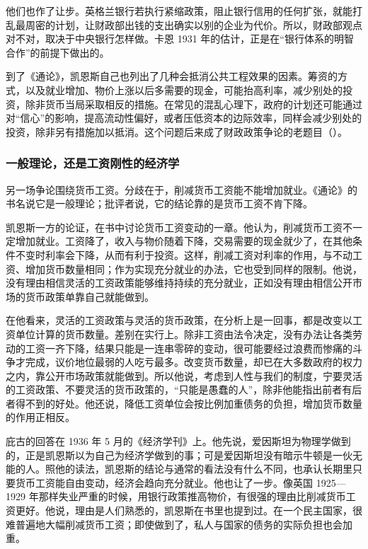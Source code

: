 他们也作了让步。英格兰银行若执行紧缩政策，阻止银行信用的任何扩张，就能打乱最周密的计划，让财政部出钱的支出确实以别的企业为代价\cite{keynes1929c}。所以，财政部观点对不对，取决于中央银行怎样做。卡恩 1931 年的估计，正是在“银行体系的明智合作”的前提下做出的\cite{kahn1931}。

到了《通论》，凯恩斯自己也列出了几种会抵消公共工程效果的因素\cite{keynes1936}。筹资的方式，以及就业增加、物价上涨以后多需要的现金，可能抬高利率，减少别处的投资，除非货币当局采取相反的措施\cite{keynes1936}。在常见的混乱心理下，政府的计划还可能通过对“信心”的影响，提高流动性偏好，或者压低资本的边际效率，同样会减少别处的投资，除非另有措施加以抵消\cite{keynes1936}。这个问题后来成了财政政策争论的老题目（）。

\subsubsection{一般理论，还是工资刚性的经济学}
另一场争论围绕货币工资。分歧在于，削减货币工资能不能增加就业。《通论》的书名说它是一般理论；批评者说，它的结论靠的是货币工资不肯下降。

凯恩斯一方的论证，在书中讨论货币工资变动的一章。他认为，削减货币工资不一定增加就业。工资降了，收入与物价随着下降，交易需要的现金就少了，在其他条件不变时利率会下降，从而有利于投资\cite{keynes1936}。这样，削减工资对利率的作用，与不动工资、增加货币数量相同；作为实现充分就业的办法，它也受到同样的限制\cite{keynes1936}。他说，没有理由相信灵活的工资政策能够维持持续的充分就业，正如没有理由相信公开市场的货币政策单靠自己就能做到\cite{keynes1936}。

在他看来，灵活的工资政策与灵活的货币政策，在分析上是一回事，都是改变以工资单位计算的货币数量\cite{keynes1936}。差别在实行上。除非工资由法令决定，没有办法让各类劳动的工资一齐下降，结果只能是一连串零碎的变动，很可能要经过浪费而惨痛的斗争才完成，议价地位最弱的人吃亏最多\cite{keynes1936}。改变货币数量，却已在大多数政府的权力之内，靠公开市场政策就能做到\cite{keynes1936}。所以他说，考虑到人性与我们的制度，宁要灵活的工资政策、不要灵活的货币政策的，“只能是愚蠢的人”，除非他能指出前者有后者得不到的好处\cite{keynes1936}。他还说，降低工资单位会按比例加重债务的负担，增加货币数量的作用正相反\cite{keynes1936}。

庇古的回答在 1936 年 5 月的《经济学刊》上\cite{pigou1936}。他先说，爱因斯坦为物理学做到的，正是凯恩斯以为自己为经济学做到的事；可是爱因斯坦没有暗示牛顿是一伙无能的人\cite{pigou1936}。照他的读法，凯恩斯的结论与通常的看法没有什么不同，也承认长期里只要货币工资能自由变动，经济会趋向充分就业\cite{pigou1936}。他也让了一步。像英国 1925—1929 年那样失业严重的时候，用银行政策推高物价，有很强的理由比削减货币工资更好。他说，理由是人们熟悉的，凯恩斯在书里也提到过。在一个民主国家，很难普遍地大幅削减货币工资；即使做到了，私人与国家的债务的实际负担也会加重\cite{pigou1936}。

